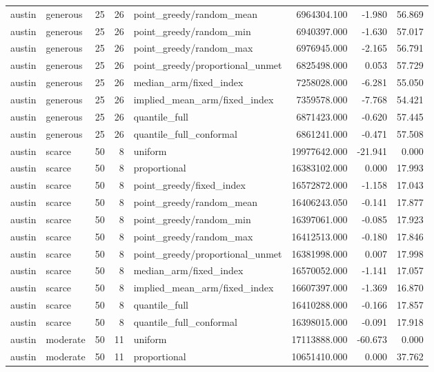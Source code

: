 \begin{tabular}{llrrlrrr}
austin & generous & 25 & 26 & point\_greedy/random\_mean & 6964304.100 & -1.980 & 56.869 \\
austin & generous & 25 & 26 & point\_greedy/random\_min & 6940397.000 & -1.630 & 57.017 \\
austin & generous & 25 & 26 & point\_greedy/random\_max & 6976945.000 & -2.165 & 56.791 \\
austin & generous & 25 & 26 & point\_greedy/proportional\_unmet & 6825498.000 & 0.053 & 57.729 \\
austin & generous & 25 & 26 & median\_arm/fixed\_index & 7258028.000 & -6.281 & 55.050 \\
austin & generous & 25 & 26 & implied\_mean\_arm/fixed\_index & 7359578.000 & -7.768 & 54.421 \\
austin & generous & 25 & 26 & quantile\_full & 6871423.000 & -0.620 & 57.445 \\
austin & generous & 25 & 26 & quantile\_full\_conformal & 6861241.000 & -0.471 & 57.508 \\
austin & scarce & 50 & 8 & uniform & 19977642.000 & -21.941 & 0.000 \\
austin & scarce & 50 & 8 & proportional & 16383102.000 & 0.000 & 17.993 \\
austin & scarce & 50 & 8 & point\_greedy/fixed\_index & 16572872.000 & -1.158 & 17.043 \\
austin & scarce & 50 & 8 & point\_greedy/random\_mean & 16406243.050 & -0.141 & 17.877 \\
austin & scarce & 50 & 8 & point\_greedy/random\_min & 16397061.000 & -0.085 & 17.923 \\
austin & scarce & 50 & 8 & point\_greedy/random\_max & 16412513.000 & -0.180 & 17.846 \\
austin & scarce & 50 & 8 & point\_greedy/proportional\_unmet & 16381998.000 & 0.007 & 17.998 \\
austin & scarce & 50 & 8 & median\_arm/fixed\_index & 16570052.000 & -1.141 & 17.057 \\
austin & scarce & 50 & 8 & implied\_mean\_arm/fixed\_index & 16607397.000 & -1.369 & 16.870 \\
austin & scarce & 50 & 8 & quantile\_full & 16410288.000 & -0.166 & 17.857 \\
austin & scarce & 50 & 8 & quantile\_full\_conformal & 16398015.000 & -0.091 & 17.918 \\
austin & moderate & 50 & 11 & uniform & 17113888.000 & -60.673 & 0.000 \\
austin & moderate & 50 & 11 & proportional & 10651410.000 & 0.000 & 37.762 \\

\end{tabular}
